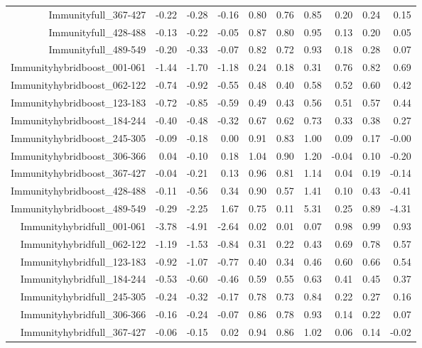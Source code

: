 \begin{table}[ht]
\begin{tabular}{rrrrrrrrrr}
  Immunityfull\_367-427 & -0.22 & -0.28 & -0.16 & 0.80 & 0.76 & 0.85 & 0.20 & 0.24 & 0.15 \\ 
  Immunityfull\_428-488 & -0.13 & -0.22 & -0.05 & 0.87 & 0.80 & 0.95 & 0.13 & 0.20 & 0.05 \\ 
  Immunityfull\_489-549 & -0.20 & -0.33 & -0.07 & 0.82 & 0.72 & 0.93 & 0.18 & 0.28 & 0.07 \\ 
  Immunityhybridboost\_001-061 & -1.44 & -1.70 & -1.18 & 0.24 & 0.18 & 0.31 & 0.76 & 0.82 & 0.69 \\ 
  Immunityhybridboost\_062-122 & -0.74 & -0.92 & -0.55 & 0.48 & 0.40 & 0.58 & 0.52 & 0.60 & 0.42 \\ 
  Immunityhybridboost\_123-183 & -0.72 & -0.85 & -0.59 & 0.49 & 0.43 & 0.56 & 0.51 & 0.57 & 0.44 \\ 
  Immunityhybridboost\_184-244 & -0.40 & -0.48 & -0.32 & 0.67 & 0.62 & 0.73 & 0.33 & 0.38 & 0.27 \\ 
  Immunityhybridboost\_245-305 & -0.09 & -0.18 & 0.00 & 0.91 & 0.83 & 1.00 & 0.09 & 0.17 & -0.00 \\ 
  Immunityhybridboost\_306-366 & 0.04 & -0.10 & 0.18 & 1.04 & 0.90 & 1.20 & -0.04 & 0.10 & -0.20 \\ 
  Immunityhybridboost\_367-427 & -0.04 & -0.21 & 0.13 & 0.96 & 0.81 & 1.14 & 0.04 & 0.19 & -0.14 \\ 
  Immunityhybridboost\_428-488 & -0.11 & -0.56 & 0.34 & 0.90 & 0.57 & 1.41 & 0.10 & 0.43 & -0.41 \\ 
  Immunityhybridboost\_489-549 & -0.29 & -2.25 & 1.67 & 0.75 & 0.11 & 5.31 & 0.25 & 0.89 & -4.31 \\ 
  Immunityhybridfull\_001-061 & -3.78 & -4.91 & -2.64 & 0.02 & 0.01 & 0.07 & 0.98 & 0.99 & 0.93 \\ 
  Immunityhybridfull\_062-122 & -1.19 & -1.53 & -0.84 & 0.31 & 0.22 & 0.43 & 0.69 & 0.78 & 0.57 \\ 
  Immunityhybridfull\_123-183 & -0.92 & -1.07 & -0.77 & 0.40 & 0.34 & 0.46 & 0.60 & 0.66 & 0.54 \\ 
  Immunityhybridfull\_184-244 & -0.53 & -0.60 & -0.46 & 0.59 & 0.55 & 0.63 & 0.41 & 0.45 & 0.37 \\ 
  Immunityhybridfull\_245-305 & -0.24 & -0.32 & -0.17 & 0.78 & 0.73 & 0.84 & 0.22 & 0.27 & 0.16 \\ 
  Immunityhybridfull\_306-366 & -0.16 & -0.24 & -0.07 & 0.86 & 0.78 & 0.93 & 0.14 & 0.22 & 0.07 \\ 
  Immunityhybridfull\_367-427 & -0.06 & -0.15 & 0.02 & 0.94 & 0.86 & 1.02 & 0.06 & 0.14 & -0.02 \\ 

\end{tabular}
\end{table}

